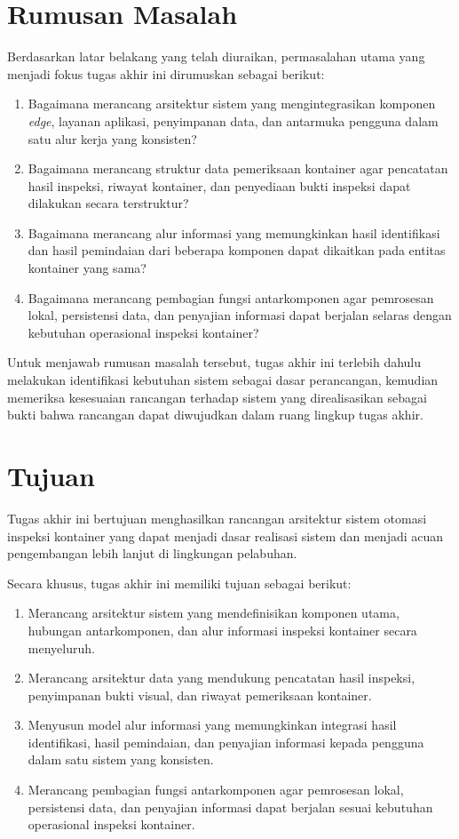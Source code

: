 \section{Rumusan Masalah}

Berdasarkan latar belakang yang telah diuraikan, permasalahan utama yang
menjadi fokus tugas akhir ini dirumuskan sebagai berikut:
\begin{enumerate}
  \item Bagaimana merancang arsitektur sistem yang mengintegrasikan
  komponen \textit{edge}, layanan aplikasi, penyimpanan data, dan antarmuka
  pengguna dalam satu alur kerja yang konsisten?
  \item Bagaimana merancang struktur data pemeriksaan kontainer agar pencatatan
  hasil inspeksi, riwayat kontainer, dan penyediaan bukti inspeksi dapat
  dilakukan secara terstruktur?
  \item Bagaimana merancang alur informasi yang memungkinkan hasil
  identifikasi dan hasil pemindaian dari beberapa komponen dapat dikaitkan pada
  entitas kontainer yang sama?
  \item Bagaimana merancang pembagian fungsi antarkomponen agar pemrosesan
  lokal, persistensi data, dan penyajian informasi dapat berjalan selaras dengan
  kebutuhan operasional inspeksi kontainer?
\end{enumerate}

Untuk menjawab rumusan masalah tersebut, tugas akhir ini terlebih dahulu
melakukan identifikasi kebutuhan sistem sebagai dasar perancangan, kemudian
memeriksa kesesuaian rancangan terhadap sistem yang direalisasikan sebagai
bukti bahwa rancangan dapat diwujudkan dalam ruang lingkup tugas akhir.

\section{Tujuan}

Tugas akhir ini bertujuan menghasilkan rancangan arsitektur sistem otomasi
inspeksi kontainer yang dapat menjadi dasar realisasi sistem dan
menjadi acuan pengembangan lebih lanjut di lingkungan pelabuhan.

Secara khusus, tugas akhir ini memiliki tujuan sebagai berikut:
\begin{enumerate}
  \item Merancang arsitektur sistem yang mendefinisikan komponen utama,
  hubungan antarkomponen, dan alur informasi inspeksi kontainer secara
  menyeluruh.
  \item Merancang arsitektur data yang mendukung pencatatan hasil inspeksi,
  penyimpanan bukti visual, dan riwayat pemeriksaan kontainer.
  \item Menyusun model alur informasi yang memungkinkan integrasi hasil
  identifikasi, hasil pemindaian, dan penyajian informasi kepada pengguna dalam
  satu sistem yang konsisten.
  \item Merancang pembagian fungsi antarkomponen agar pemrosesan lokal,
  persistensi data, dan penyajian informasi dapat berjalan sesuai kebutuhan
  operasional inspeksi kontainer.
\end{enumerate}

